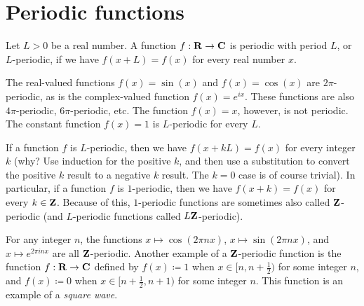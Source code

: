 \section{Periodic functions}\label{sec 5.1}

\begin{definition}\label{5.1.1}
    Let \(L > 0\) be a real number.
    A function \(f : \mathbf{R} \to \mathbf{C}\) is periodic with period \(L\), or \(L\)-periodic, if we have \(f(x + L) = f(x)\) for every real number \(x\).
\end{definition}

\begin{example}\label{5.1.2}
    The real-valued functions \(f(x) = \sin(x)\) and \(f(x) = \cos(x)\) are \(2\pi\)-periodic, as is the complex-valued function \(f(x) = e^{i x}\).
    These functions are also \(4\pi\)-periodic, \(6\pi\)-periodic, etc.
    The function \(f(x) = x\), however, is not periodic.
    The constant function \(f(x) = 1\) is \(L\)-periodic for every \(L\).
\end{example}

\begin{remark}\label{5.1.3}
    If a function \(f\) is \(L\)-periodic, then we have \(f(x + kL) = f(x)\) for every integer \(k\)
    (why? Use induction for the positive \(k\), and then use a substitution to convert the positive \(k\) result to a negative \(k\) result.
    The \(k = 0\) case is of course trivial).
    In particular, if a function \(f\) is \(1\)-periodic, then we have \(f(x + k) = f(x)\) for every \(k \in \mathbf{Z}\).
    Because of this, \(1\)-periodic functions are sometimes also called \(\mathbf{Z}\)-periodic
    (and \(L\)-periodic functions called \(L \mathbf{Z}\)-periodic).
\end{remark}

\begin{example}\label{5.1.4}
    For any integer \(n\), the functions \(x \mapsto \cos(2 \pi n x)\), \(x \mapsto \sin(2 \pi n x)\), and \(x \mapsto e^{2 \pi i n x}\) are all \(\mathbf{Z}\)-periodic.
    Another example of a \(\mathbf{Z}\)-periodic function is the function \(f : \mathbf{R} \to \mathbf{C}\) defined by \(f(x) \coloneqq 1\) when \(x \in [n, n + \frac{1}{2})\) for some integer \(n\), and \(f(x) \coloneqq 0\) when \(x \in [n + \frac{1}{2}, n + 1)\) for some integer \(n\).
    This function is an example of a \emph{square wave}.
\end{example}

